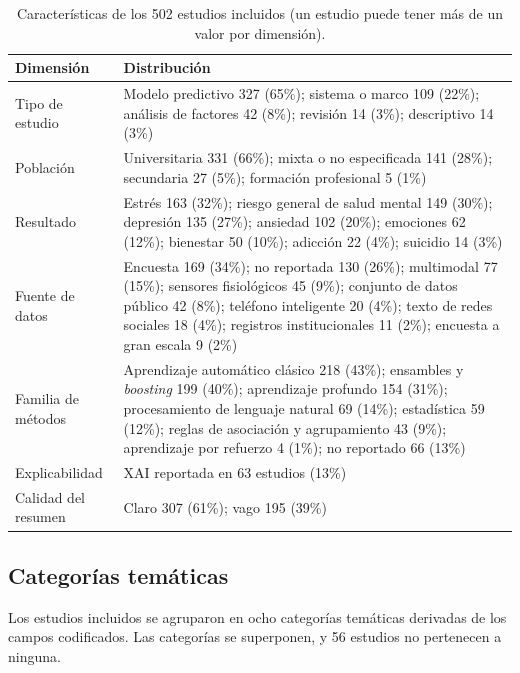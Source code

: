 \documentclass[11pt,a4paper]{article}
\begin{document}
\begin{table}[htbp]
\centering
\caption{Características de los 502 estudios incluidos (un estudio puede tener más de un valor por dimensión).}
\label{tab:overview}
\small
\begin{tabularx}{\textwidth}{lY}
\toprule
Dimensión & Distribución \\
\midrule
Tipo de estudio & Modelo predictivo 327 (65\%); sistema o marco 109 (22\%); análisis de factores 42 (8\%); revisión 14 (3\%); descriptivo 14 (3\%) \\
Población & Universitaria 331 (66\%); mixta o no especificada 141 (28\%); secundaria 27 (5\%); formación profesional 5 (1\%) \\
Resultado & Estrés 163 (32\%); riesgo general de salud mental 149 (30\%); depresión 135 (27\%); ansiedad 102 (20\%); emociones 62 (12\%); bienestar 50 (10\%); adicción 22 (4\%); suicidio 14 (3\%) \\
Fuente de datos & Encuesta 169 (34\%); no reportada 130 (26\%); multimodal 77 (15\%); sensores fisiológicos 45 (9\%); conjunto de datos público 42 (8\%); teléfono inteligente 20 (4\%); texto de redes sociales 18 (4\%); registros institucionales 11 (2\%); encuesta a gran escala 9 (2\%) \\
Familia de métodos & Aprendizaje automático clásico 218 (43\%); ensambles y \emph{boosting} 199 (40\%); aprendizaje profundo 154 (31\%); procesamiento de lenguaje natural 69 (14\%); estadística 59 (12\%); reglas de asociación y agrupamiento 43 (9\%); aprendizaje por refuerzo 4 (1\%); no reportado 66 (13\%) \\
Explicabilidad & XAI reportada en 63 estudios (13\%) \\
Calidad del resumen & Claro 307 (61\%); vago 195 (39\%) \\
\bottomrule
\end{tabularx}
\end{table}

\subsection{Categorías temáticas}

Los estudios incluidos se agruparon en ocho categorías temáticas derivadas de los campos codificados. Las categorías se superponen, y 56 estudios no pertenecen a ninguna.
\end{document}
